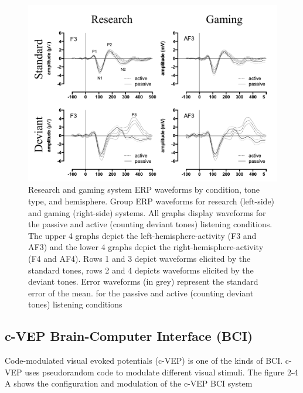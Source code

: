 \begin{figure}[h]
	\centering
  	\includegraphics[scale = 0.75]{chapter2/24.pdf}
  	\caption{Research and gaming system ERP waveforms by condition, tone type, and hemisphere. Group ERP waveforms for research (left-side) and gaming (right-side) systems. All graphs display waveforms for the passive and active (counting deviant tones) listening conditions. The upper 4 graphs depict the left-hemisphere-activity (F3 and AF3) and the lower 4 graphs depict the right-hemisphere-activity (F4 and AF4). Rows 1 and 3 depict waveforms elicited by the standard tones, rows 2 and 4 depicts waveforms elicited by the deviant tones. Error waveforms (in grey) represent the standard error of the mean. for the passive and active (counting deviant tones) listening conditions}
\end{figure}
\newpage

\subsection {c-VEP Brain-Computer Interface (BCI)\cite{ref5}}

\hspace{1.5cm} Code-modulated visual evoked potentials (c-VEP) is one of the kinds of BCI. c-VEP uses pseudorandom code to modulate different visual stimuli. The figure 2-4 A shows the configuration and modulation of the c-VEP BCI system

